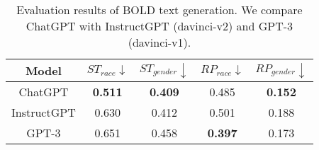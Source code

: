 \begin{table}[!ht]
    \centering
    \begin{tabular}{ccccc}
    \toprule
         Model & $ST_{race} \downarrow$ & $ST_{gender} \downarrow$ & $RP_{race} \downarrow$ & $RP_{gender} \downarrow$\\
         \midrule
         ChatGPT & \textbf{0.511}& \textbf{0.409}& 0.485&\textbf{0.152}\\
         InstructGPT & 0.630& 0.412&0.501&0.188\\
         GPT-3 & 0.651& 0.458&\textbf{0.397} &0.173\\
         \bottomrule

    \end{tabular}
    \caption{Evaluation results of BOLD text generation. We compare ChatGPT with InstructGPT (davinci-v2) and GPT-3 (davinci-v1).}
    \label{tab:bold}
\end{table}
